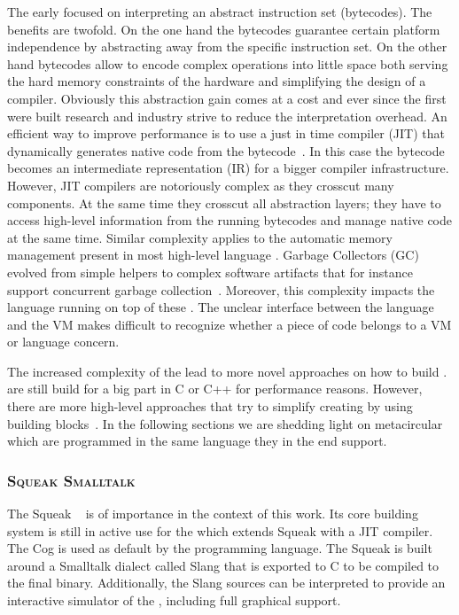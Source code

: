 The early \VMs focused on interpreting an abstract instruction set (bytecodes).
The benefits are twofold.
On the one hand the bytecodes guarantee certain platform independence by abstracting away from the \CPU specific instruction set.
On the other hand bytecodes allow to encode complex operations into little space both serving the hard memory constraints of the hardware and simplifying the design of a compiler.
Obviously this abstraction gain comes at a cost and ever since the first \VMs were built research and industry strive to reduce the interpretation overhead.
An efficient way to improve performance is to use a just in time compiler (JIT) that dynamically generates native code from the bytecode~\cite{Deut84a}.
In this case the bytecode becomes an intermediate representation (IR) for a bigger compiler infrastructure.
However, JIT compilers are notoriously complex as they crosscut many \VM components.
At the same time they crosscut all abstraction layers; they have to access high-level information from the running bytecodes and manage native code at the same time.
Similar complexity applies to the automatic memory management present in most high-level language \VMs.
Garbage Collectors (GC) evolved from simple helpers to complex software artifacts that for instance support concurrent garbage collection~\cite{Clic05a}.
Moreover, this complexity impacts the language running on top of these \VMs. The unclear interface between the language and the VM makes difficult to recognize whether a piece of code belongs to a VM or language concern.

The increased complexity of the \VMs lead to more novel approaches on how to build \VMs.
\VMs are still build for a big part in C or C++ for performance reasons.
However, there are more high-level approaches that try to simplify creating \VMs by using building blocks~\cite{Geof10a}.
In the following sections we are shedding light on metacircular \VMs which are programmed in the same language they in the end support.


\subsubsection*{\textsc{Squeak Smalltalk \VM}}
The Squeak \VM~\cite{Inga97a} is of importance in the context of this work.
Its core building system is still in active use for the  which extends Squeak with a JIT compiler.
The Cog \VM is used as default by the  programming language.
The Squeak \VM is built around a Smalltalk dialect called Slang that is exported to C to be compiled to the final \VM binary.
Additionally, the Slang sources can be interpreted to provide an interactive simulator of the \VM, including full graphical support.

